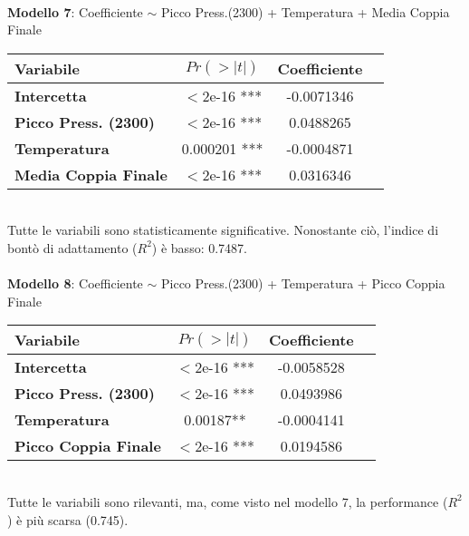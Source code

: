 \documentclass[fleqn,10pt]{SelfArx} %
\begin{document}
\\
\textbf{Modello 7}: Coefficiente $\sim$ Picco Press.(2300) + Temperatura + Media Coppia Finale
{\begin{table}[h] 
\centering
\begin{tabular}[t]{lccc}
\toprule 
Variabile&$Pr(> |t|)$&Coefficiente\\
\midrule 
\textbf{Intercetta}&$<$2e-16 ***&-0.0071346\\ 
\textbf{Picco Press. (2300)}&$<$2e-16 ***&0.0488265\\
\textbf{Temperatura}&0.000201 ***&-0.0004871\\
\textbf{Media Coppia Finale}&$<$2e-16 ***&0.0316346\\
\bottomrule 
\end{tabular}
\end{table}}\\
Tutte le variabili sono statisticamente significative. Nonostante ciò, l'indice di bontò di adattamento ($R^2$) è basso: 0.7487.\\
\\
\textbf{Modello 8}: Coefficiente $\sim$ Picco Press.(2300) + Temperatura + Picco Coppia Finale
{\begin{table}[h] 
\centering
\begin{tabular}[t]{lccc}
\toprule 
Variabile&$Pr(> |t|)$&Coefficiente\\
\midrule 
\textbf{Intercetta}&$<$2e-16 ***&-0.0058528\\ 
\textbf{Picco Press. (2300)}&$<$2e-16 ***&0.0493986\\
\textbf{Temperatura}&0.00187**&-0.0004141\\
\textbf{Picco Coppia Finale}&$<$2e-16 ***&0.0194586\\
\bottomrule 
\end{tabular}
\end{table}}\\
Tutte le variabili sono rilevanti, ma, come visto nel modello 7, la performance ($R^2$) è più scarsa (0.745).
\end{document}
